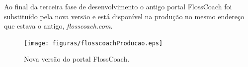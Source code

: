 Ao final da terceira fase de desenvolvimento o antigo portal FlossCoach foi substituído pela
nova versão e está disponível na produção no mesmo endereço que estava o antigo, \textit{flosscoach.com}.

\begin{figure}[h]
	\centering
	\label{fig:producao}
		\texttt{[image: figuras/flosscoachProducao.eps]}
	\caption{Nova versão do portal FlossCoach.}
\end{figure}
